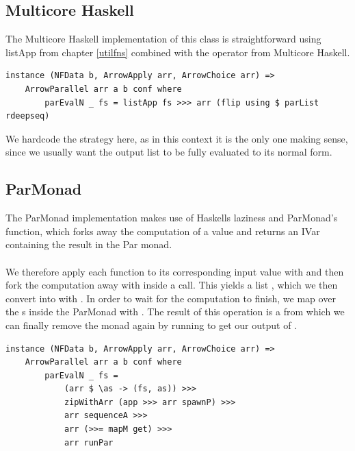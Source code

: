 \subsection{Multicore Haskell}
The Multicore Haskell implementation of this class is straightforward using listApp from chapter \ref{utilfns} combined with the  operator from Multicore Haskell.
\begin{lstlisting}[frame=htrbl]
instance (NFData b, ArrowApply arr, ArrowChoice arr) =>
	ArrowParallel arr a b conf where
		parEvalN _ fs = listApp fs >>> arr (flip using $ parList rdeepseq)
\end{lstlisting}
We hardcode the  strategy here, as in this context it is the only one making sense, since we usually want the output list to be fully evaluated to its normal form.

\subsection{ParMonad}
The ParMonad implementation makes use of Haskells laziness and ParMonad's  function, which forks away the computation of a value and returns an IVar containing the result in the Par monad.
\\\\
We therefore apply each function to its corresponding input value with  and then fork the computation away with  inside a  call. This yields a list , which we then convert into  with . In order to wait for the computation to finish, we map over the s inside the ParMonad with . The result of this operation is a  from which we can finally remove the monad again by running  to get our output of \code{[b]}.
\begin{lstlisting}[frame=htrbl]
instance (NFData b, ArrowApply arr, ArrowChoice arr) =>
	ArrowParallel arr a b conf where
		parEvalN _ fs = 
			(arr $ \as -> (fs, as)) >>>
			zipWithArr (app >>> arr spawnP) >>>
			arr sequenceA >>>
			arr (>>= mapM get) >>>
			arr runPar
\end{lstlisting}

